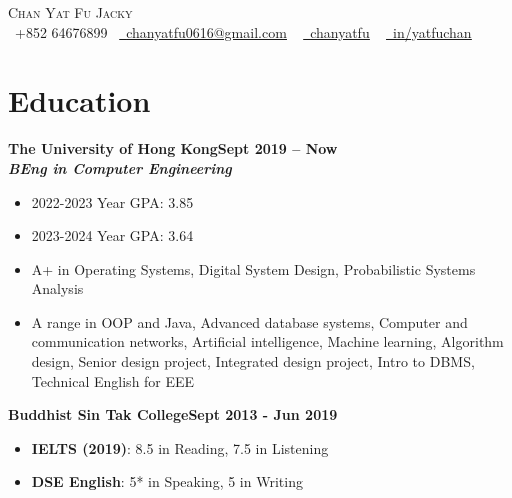 \documentclass[a4paper,10pt]{article}
\begin{document}
\begin{center}
  {\Huge \scshape Chan Yat Fu Jacky} \\ \vspace{5pt}
  \small \raisebox{-0.1\height}\faPhone\ +852 64676899~ \href{mailto:chanyatfu0616@gmail.com}{\raisebox{-0.2\height}\faEnvelope\  \underline{chanyatfu0616@gmail.com}} ~
  \href{https://github.com/chanyatfu}{\raisebox{-0.2\height}\faGithub\ \underline{chanyatfu}} ~
  \href{https://hk.linkedin.com/in/yatfuchan}{\raisebox{-0.2\height}\faLinkedin\ \underline{in/yatfuchan}}  ~
  \vspace{-3pt}
\end{center}

\newcommand*{\bb}[2]{{\small\bfseries#1\hfill{\small#2}}\\}
\newcommand*{\cc}[2]{{\bfseries\textit{\small#1}\hfill\textit{\small#2}}\\}
\newenvironment{tightitemize}{\begin{itemize}[leftmargin=2em,topsep=1pt,partopsep=1pt,noitemsep]\small}{\end{itemize}\vspace*{2pt}}

\section{Education}

\bb{The University of Hong Kong}{Sept 2019 -- Now}
\cc{BEng in Computer Engineering}{}
\begin{tightitemize}
  \item 2022-2023 Year GPA: 3.85
  \item 2023-2024 Year GPA: 3.64
  \item A+ in Operating Systems, Digital System Design, Probabilistic Systems Analysis
  \item A range in OOP and Java, Advanced database systems, Computer and communication networks, Artificial intelligence, Machine learning, Algorithm design, Senior design project, Integrated design project, Intro to DBMS, Technical English for EEE
\end{tightitemize}

\bb{Buddhist Sin Tak College}{Sept 2013 - Jun 2019}
\begin{tightitemize}
  \item \textbf{IELTS (2019)}: 8.5 in Reading, 7.5 in Listening
  \item \textbf{DSE English}: 5* in Speaking, 5 in Writing
\end{tightitemize}
\end{document}
